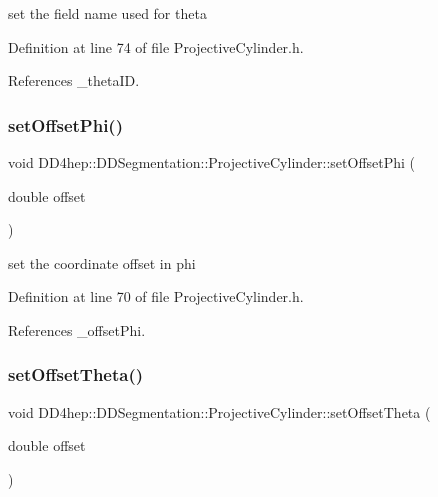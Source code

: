 set the field name used for theta 



Definition at line 74 of file Projective\+Cylinder.\+h.



References \+\_\+theta\+ID.

\hypertarget{class_d_d4hep_1_1_d_d_segmentation_1_1_projective_cylinder_a0247ee2fcb59209e87206e4f2601b263}{}\label{class_d_d4hep_1_1_d_d_segmentation_1_1_projective_cylinder_a0247ee2fcb59209e87206e4f2601b263} 
\subsubsection{\texorpdfstring{set\+Offset\+Phi()}{setOffsetPhi()}}
{\footnotesize\ttfamily void D\+D4hep\+::\+D\+D\+Segmentation\+::\+Projective\+Cylinder\+::set\+Offset\+Phi (\begin{DoxyParamCaption}\item[{double}]{offset }\end{DoxyParamCaption})\hspace{0.3cm}{\ttfamily [inline]}}



set the coordinate offset in phi 



Definition at line 70 of file Projective\+Cylinder.\+h.



References \+\_\+offset\+Phi.

\hypertarget{class_d_d4hep_1_1_d_d_segmentation_1_1_projective_cylinder_aa6c8515e197f47d176727c8fb6f935a0}{}\label{class_d_d4hep_1_1_d_d_segmentation_1_1_projective_cylinder_aa6c8515e197f47d176727c8fb6f935a0} 
\subsubsection{\texorpdfstring{set\+Offset\+Theta()}{setOffsetTheta()}}
{\footnotesize\ttfamily void D\+D4hep\+::\+D\+D\+Segmentation\+::\+Projective\+Cylinder\+::set\+Offset\+Theta (\begin{DoxyParamCaption}\item[{double}]{offset }\end{DoxyParamCaption})\hspace{0.3cm}{\ttfamily [inline]}}



